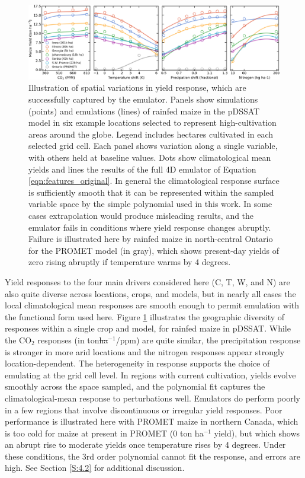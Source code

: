 \documentclass[gmdd]{copernicus} %
\providecommand{\DIFadd}[1]{{\protect\color{blue}\uwave{#1}}} %
\providecommand{\DIFdel}[1]{{\protect\color{red}\sout{#1}}}                      %
\providecommand{\DIFaddbegin}{} %
\providecommand{\DIFaddend}{} %
\providecommand{\DIFdelbegin}{} %
\providecommand{\DIFdelend}{} %
\begin{document}
\begin{figure}[ht]
\centering
    \includegraphics[width=16.3cm]{figures/regression_example.png}
    \caption{
    Illustration of spatial variations in yield response, which are successfully captured by the emulator. 
    Panels show simulations (points) and emulations (lines) of rainfed maize in the pDSSAT model in six example locations selected to represent high-cultivation areas around the globe. 
    Legend includes hectares cultivated in each selected grid cell. 
    Each panel shows variation along a single variable, with others held at baseline values. 
    Dots show climatological mean yields and lines the results of the full 4D emulator of Equation \ref{eqn:features_original}. 
    In general the climatological response surface is sufficiently smooth that it can be represented within the sampled variable space by the simple polynomial used in this work. 
    In some cases extrapolation would produce misleading results, and the emulator fails in conditions where yield response changes abruptly. 
    Failure is illustrated here by rainfed maize in north-central Ontario for the PROMET model (in gray), which shows present-day yields of zero rising abruptly if temperature warms by 4 degrees.
    }
   \label{fig:regression}
\end{figure}

Yield responses to the four main drivers considered here (C, T, W, and N) are also quite diverse across locations, crops, and models, but in nearly all cases the local climatological mean responses are smooth enough to permit emulation with the functional form used here.
Figure \ref{fig:regression} illustrates the geographic diversity of responses within a single crop and model, for rainfed maize in pDSSAT. 
While the CO$_2$ responses (in ton\DIFdelbegin \DIFdel{ha$^{-1}$}\DIFdelend \DIFaddbegin \DIFadd{/ha}\DIFaddend /ppm) are quite similar, the  precipitation response is stronger in more arid locations and the nitrogen responses appear strongly location-dependent. 
The heterogeneity in response supports the choice of emulating at the grid cell level. 
In regions with current cultivation, yields evolve smoothly across the space sampled, and the polynomial fit captures the climatological-mean response to perturbations well. 
Emulators do perform poorly in a few regions that involve discontinuous or irregular yield responses. 
Poor performance is illustrated here with PROMET maize in northern Canada, which is too cold for maize at present in PROMET (0 ton ha$^{-1}$ yield), but which shows an abrupt rise to moderate yields once temperature rises by 4 degrees.
Under these conditions, the 3rd order polynomial cannot fit the response, and errors are high. See Section \ref{S:4.2} for additional discussion. 
\end{document}

